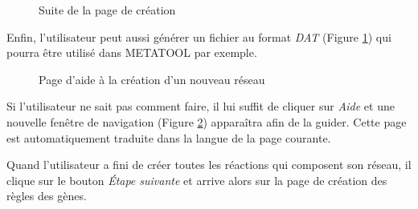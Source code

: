 \begin{figure}[!ht]
	\begin{center}
		\caption{Suite de la page de création}
  		\label{creation2}
  	\end{center}	
\end{figure}

Enfin, l'utilisateur peut aussi générer un fichier au format \emph{DAT} (Figure \ref{creation2}) qui pourra être utilisé dans METATOOL par exemple.\\

\begin{figure}[!ht]
	\begin{center}
		\caption{Page d'aide à la création d'un nouveau réseau}
  		\label{helpCreation}
  	\end{center}	
\end{figure}

Si l'utilisateur ne sait pas comment faire, il lui suffit de cliquer sur \textit{Aide} et une nouvelle fen\^etre de navigation (Figure \ref{helpCreation}) appara\^itra afin de la guider. Cette page est automatiquement traduite dans la langue de la page courante. 

Quand l'utilisateur a fini de créer toutes les réactions qui composent son réseau, il clique sur le bouton \emph{\'Etape suivante} et arrive alors sur la page de création des règles des gènes.

